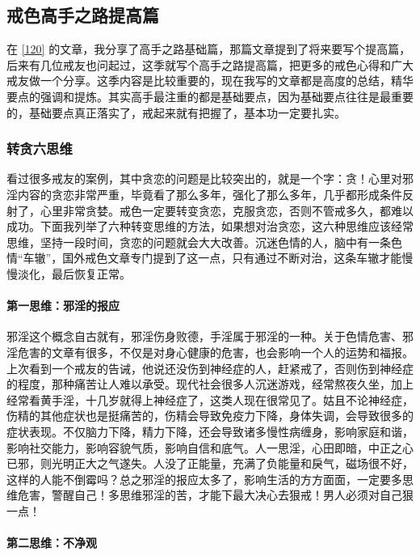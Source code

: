 \subsection{戒色高手之路提高篇}

在 \ref{120} 的文章，我分享了高手之路基础篇，那篇文章提到了将来要写个提高篇，后来有几位戒友也问起过，这季就写个高手之路提高篇，把更多的戒色心得和广大戒友做一个分享。这季内容是比较重要的，现在我写的文章都是高度的总结，精华要点的强调和提炼。其实高手最注重的都是基础要点，因为基础要点往往是最重要的，基础要点真正落实了，戒起来就有把握了，基本功一定要扎实。

\subsubsection{转贪六思维}

看过很多戒友的案例，其中贪恋的问题是比较突出的，就是一个字：贪！心里对邪淫内容的贪恋非常严重，毕竟看了那么多年，强化了那么多年，几乎都形成条件反射了，心里非常贪婪。戒色一定要转变贪恋，克服贪恋，否则不管戒多久，都难以成功。下面我列举了六种转变思维的方法，如果想对治贪恋，这六种思维应该经常思维，坚持一段时间，贪恋的问题就会大大改善。沉迷色情的人，脑中有一条色情“车辙”，国外戒色文章专门提到了这一点，只有通过不断对治，这条车辙才能慢慢淡化，最后恢复正常。

\paragraph{第一思维：邪淫的报应}

邪淫这个概念自古就有，邪淫伤身败德，手淫属于邪淫的一种。关于色情危害、邪淫危害的文章有很多，不仅是对身心健康的危害，也会影响一个人的运势和福报。上次看到一个戒友的告诫，他说还没伤到神经症的人，赶紧戒了，否则伤到神经症的程度，那种痛苦让人难以承受。现代社会很多人沉迷游戏，经常熬夜久坐，加上经常看黄手淫，十几岁就得上神经症了，这类人现在很常见了。姑且不论神经症，伤精的其他症状也是挺痛苦的，伤精会导致免疫力下降，身体失调，会导致很多的症状表现。不仅脑力下降，精力下降，还会导致诸多慢性病缠身，影响家庭和谐，影响社交能力，影响容貌气质，影响自信和底气。人一思淫，心田即暗，中正之心已邪，则光明正大之气遂失。人没了正能量，充满了负能量和戾气，磁场很不好，这样的人能不倒霉吗？总之邪淫的报应太多了，影响生活的方方面面，一定要多思维危害，警醒自己！多思维邪淫的苦，才能下最大决心去狠戒！男人必须对自己狠一点！

\paragraph{第二思维：不净观}

